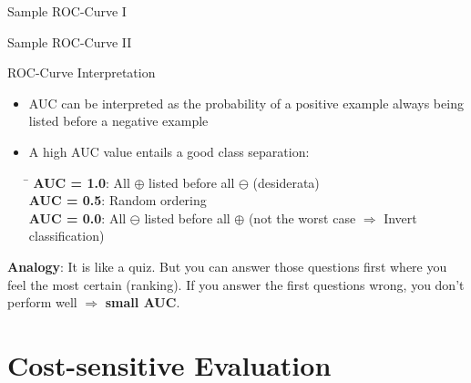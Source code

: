 \begin{frame}{Sample ROC-Curve I}{}
\end{frame}


\begin{frame}{Sample ROC-Curve II}{}
	\vspace*{5mm}
	
\end{frame}


\begin{frame}{ROC-Curve Interpretation}{}
	\vspace*{-2mm}
	\begin{itemize}
		\item AUC can be interpreted as the probability of a positive example always being listed before a negative example
		\item A high AUC value entails a good class separation:

		\footnotesize
		\begin{tabbing}
			\hspace*{2.5cm}\= \kill
			\textbf{AUC = 1.0}: 		\>	All $\oplus$ listed before all $\ominus$ (desiderata)			\\
			\textbf{AUC = 0.5}: 		\>	Random ordering									\\
			\textbf{AUC = 0.0}: 		\>	All $\ominus$ listed before all $\oplus$
										(not the worst case $\Rightarrow$ Invert classification)
		\end{tabbing}
	\end{itemize}

	\begin{boxBlueNoFrame}
		\footnotesize
		\textbf{Analogy}: It is like a quiz. But you can answer those questions first where you feel the
		most certain (ranking). If you answer the first questions wrong, you don't perform well $\Rightarrow$ \textbf{small AUC}.
	\end{boxBlueNoFrame}
\end{frame}


\section{Cost-sensitive Evaluation}

